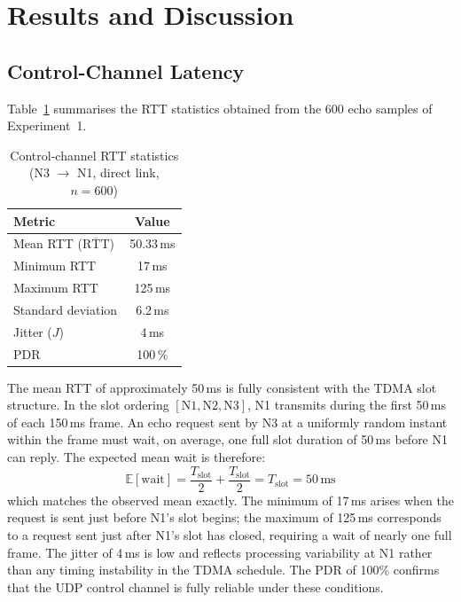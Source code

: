 \section{Results and Discussion}
\label{sec:results}

\subsection{Control-Channel Latency}
\label{subsec:res-rtt}

Table~\ref{tab:rtt} summarises the RTT statistics obtained from the 600
echo samples of Experiment~1.

\begin{table}[h]
\centering
\caption{Control-channel RTT statistics (N3 $\to$ N1, direct link, $n = 600$)}
\label{tab:rtt}
\begin{tabular}{lc}
\toprule
\textbf{Metric} & \textbf{Value} \\
\midrule
Mean RTT ($\overline{\mathrm{RTT}}$) & 50.33\,ms \\
Minimum RTT  & 17\,ms  \\
Maximum RTT  & 125\,ms \\
Standard deviation & 6.2\,ms \\
Jitter ($J$) & 4\,ms   \\
PDR          & 100\,\% \\
\bottomrule
\end{tabular}
\end{table}

The mean RTT of approximately 50\,ms is fully consistent with the TDMA
slot structure. In the slot ordering $[\text{N1}, \text{N2}, \text{N3}]$,
N1 transmits during the first 50\,ms of each 150\,ms frame. An echo
request sent by N3 at a uniformly random instant within the frame must
wait, on average, one full slot duration of 50\,ms before N1 can reply.
The expected mean wait is therefore:
\begin{equation}
\mathbb{E}[\text{wait}] = \frac{T_{\mathrm{slot}}}{2} + \frac{T_{\mathrm{slot}}}{2}
= T_{\mathrm{slot}} = 50\,\text{ms}
\label{eq:expected-rtt}
\end{equation}
which matches the observed mean exactly. The minimum of 17\,ms arises
when the request is sent just before N1's slot begins; the maximum of
125\,ms corresponds to a request sent just after N1's slot has closed,
requiring a wait of nearly one full frame. The jitter of 4\,ms is low and
reflects processing variability at N1 rather than any timing instability
in the TDMA schedule. The PDR of 100\% confirms that the UDP control
channel is fully reliable under these conditions.

